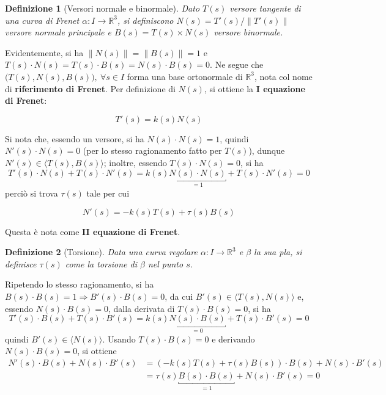 \documentclass[12pt]{scrartcl}
\theoremstyle{style}
\newtheorem{definizione}{Definizione}[section]
\newenvironment{boxenv}[1][]{
    \begin{eqbox}[#1]
    }{
   \end{eqbox}
}
\numberwithin{equation}{subsection}
\renewcommand{\textbf}[1]{\textsf{\bfseries #1}}
\begin{document}
\begin{definizione}
	[Versori normale e binormale]
	Dato $T(s)$ versore tangente di una curva di Frenet $\alpha : I \to \mathbb{R}^3$, si definiscono $N(s) = T'(s) / \left\lVert T'(s) \right\rVert $ \textit{versore normale principale} e $B(s) = T(s) \times N(s)$ \textit{versore binormale}.
\end{definizione}
\noindent Evidentemente, si ha $\left\lVert N(s) \right\rVert =\left\lVert B(s) \right\rVert  = 1 $ e $T(s) \cdot N(s) = T(s) \cdot B(s) = N(s) \cdot B(s) =  0 $.
Ne segue che $\big(T(s),N(s),B(s)\big), \ \forall s \in I$ forma una base ortonormale di $\mathbb{R}^3$, nota col nome di \textbf{riferimento di Frenet}.
Per definizione di $N(s)$, si ottiene la \textbf{I equazione di Frenet}:
\begin{boxenv}[]
\begin{equation}
	T'(s) = k(s) N(s)
\end{equation}
\end{boxenv}
\noindent Si nota che, essendo un versore, si ha $N(s) \cdot N(s) = 1$, quindi $N'(s) \cdot N(s) = 0$ (per lo stesso ragionamento fatto per $T(s)$), dunque $N'(s) \in \langle T(s) , B(s) \rangle$; inoltre, essendo $T(s)\cdot N(s) = 0$, si ha 
\[
	T'(s) \cdot N(s) +T(s)\cdot  N'(s)=k(s) \underbracket{N(s) \cdot N(s)}_{=1}  +T(s)\cdot  N'(s) = 0 
\] 
perci\`o si trova $ \tau (s)$ tale per cui 
\begin{boxenv}[]
\begin{equation}
	N'(s) = -k(s)  T(s) + \tau (s)  B(s)
\end{equation}
\end{boxenv}
\noindent Questa \`e nota come \textbf{II equazione di Frenet}.
\begin{definizione}
	[Torsione]
	Data una curva regolare $\alpha :I\to\mathbb{R}^3$ e $\beta $ la sua pla, si definisce $\tau (s)$ come la \textit{torsione} di $\beta $ nel punto $s$.
\end{definizione}
\noindent Ripetendo lo stesso ragionamento, si ha $B(s) \cdot B(s) = 1 \Rightarrow B'(s) \cdot B(s) = 0$, da cui $B'(s) \in \langle T(s),N(s) \rangle$ e, essendo $N(s) \cdot B(s) = 0$, dalla derivata di $T(s) \cdot B(s) = 0$, si ha
\[
	T'(s) \cdot B(s) + T(s) \cdot B'(s) = k(s) \underbracket{N(s) \cdot B(s)}_{=0}  + T(s) \cdot B'(s) = 0
\] 
quindi $B'(s) \in \langle N(s) \rangle$.
Usando $T(s) \cdot B(s) = 0 $ e derivando $N(s) \cdot B(s) = 0$, si ottiene
\[
	\begin{split}
		N'(s) \cdot B(s) + N(s) \cdot B'(s) &= (- k(s) T(s) + \tau (s) B(s) )\cdot B(s) + N(s) \cdot B'(s) \\
		&= \tau (s) \underbracket{B(s)\cdot B(s)}_{=1}  + N(s)\cdot B'(s) = 0 
	\end{split}
\] 
\end{document}
